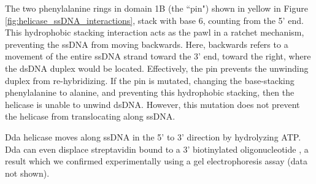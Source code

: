 The two phenylalanine rings in domain 1B (the ``pin") shown in yellow in Figure \ref{fig:helicase_ssDNA_interactions}, stack with base 6, counting from the 5' end.  This hydrophobic stacking interaction acts as the pawl in a ratchet mechanism, preventing the ssDNA from moving backwards.  Here, backwards refers to a movement of the entire ssDNA strand toward the 3' end, toward the right, where the dsDNA duplex would be located.  Effectively, the pin prevents the unwinding duplex from re-hybridizing.  If the pin is mutated, changing the base-stacking phenylalanine to alanine, and preventing this hydrophobic stacking, then the helicase is unable to unwind dsDNA.  However, this mutation does not prevent the helicase from translocating along ssDNA. \citep{He2012}

Dda helicase moves along ssDNA in the 5' to 3' direction by hydrolyzing ATP.  Dda can even displace streptavidin bound to a 3' biotinylated oligonucleotide \citep{Morris1999}, a result which we confirmed experimentally using a gel electrophoresis assay (data not shown). %


